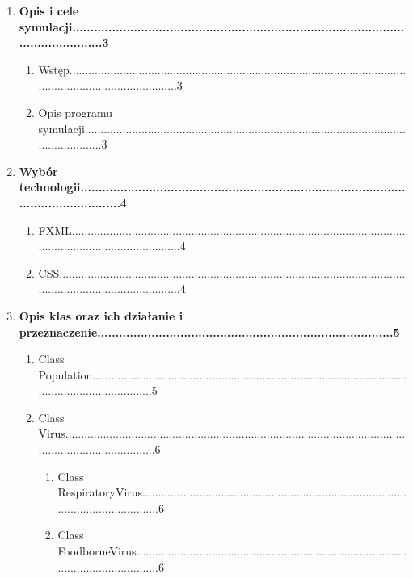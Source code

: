\documentclass[a4paper]{article}
\begin{document}
\begin{enumerate}[series=listWWNumiv,label=\arabic*]
	\item \textbf{Opis i cele symulacji...................................................................................................................3}
	\begin{enumerate}[label=1.\arabic*,leftmargin=2em]
		\item Wstęp.......................................................................................................................................................3
		\item Opis programu symulacji..........................................................................................................................3
	\end{enumerate}
	\item \textbf{Wybór technologii......................................................................................................................4}
	\begin{enumerate}[label=2.\arabic*,leftmargin=2em]
		\item FXML.......................................................................................................................................................4
		\item CSS...........................................................................................................................................................4
	\end{enumerate}
	\item \textbf{Opis klas oraz ich działanie i przeznaczenie..................................................................................5}
	\begin{enumerate}[label=3.\arabic*,leftmargin=2em]
		\item Class Population........................................................................................................................................5
		\item Class Virus.................................................................................................................................................6
		\begin{enumerate}[label=3.2.\arabic*,leftmargin=3em]
			\item Class RespiratoryVirus....................................................................................................................6
			\item Class FoodborneVirus......................................................................................................................6

\end{enumerate}
\end{enumerate}
\end{enumerate}
\end{document}
